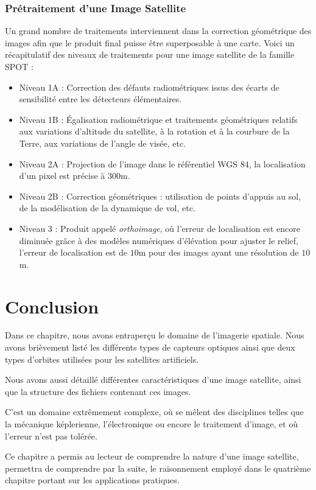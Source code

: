 \documentclass[a4paper, 11pt]{report}
\begin{document}
\subsubsection{Prétraitement d'une Image Satellite}
Un grand nombre de traitements interviennent dans la correction géométrique des images afin que le produit final puisse être superposable à une carte.
Voici un récapitulatif des niveaux de traitements pour une image satellite de la famille SPOT :
\begin{itemize}
	\item Niveau 1A : Correction des défauts radiométriques issus des écarts de sensibilité entre les détecteurs élémentaires.
	\item Niveau 1B : Égalisation radiométrique et traitements géométriques relatifs aux variations d'altitude du satellite, à la rotation et à la courbure de la Terre, aux variations de l'angle de visée, etc.
	\item Niveau 2A : Projection de l'image dans le référentiel WGS $84$, la localisation d'un pixel est précise à $300$m.
	\item Niveau 2B : Correction géométriques : utilisation de points d'appuis au sol, de la modélisation de la dynamique de vol, etc.
	\item Niveau 3 : Produit appelé \emph{orthoimage}, où l'erreur de localisation est encore diminuée grâce à des modèles numériques d'élévation pour ajuster le relief, l'erreur de localisation est de $10$m pour des images ayant une résolution de $10$m.
\end{itemize}
\section{Conclusion}
Dans ce chapitre, nous avons entraperçu le domaine de l'imagerie spatiale.
Nous avons brièvement listé les différents types de capteurs optiques ainsi que deux types d'orbites utilisées pour les satellites artificiels.

Nous avons aussi détaillé différentes caractéristiques d'une image satellite, ainsi que la structure des fichiers contenant ces images.

C'est un domaine extrêmement complexe, où se mêlent des disciplines telles que la mécanique képlerienne, l'électronique ou encore le traitement d'image, et où l'erreur n'est pas tolérée.

Ce chapitre a permis au lecteur de comprendre la nature d'une image satellite, permettra de comprendre par la suite, le raisonnement employé dans le quatrième chapitre portant sur les applications pratiques.
\end{document}
